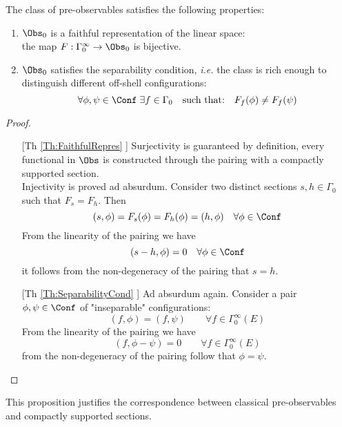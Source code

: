 \documentclass[Main]{subfiles}
\begin{document}
				\begin{proposition}
					The class of pre-observables satisfies the following properties:
					\begin{enumerate}
						\item\label{Th:FaithfulRepres} $\Obs_0$ is a faithful representation of the linear space:\\
									the map $F: \Gamma_0^\infty \rightarrow \Obs_0$ is bijective.
						\item\label{Th:SeparabilityCond} $\Obs_0$ satisfies the separability condition, \textit{i.e.} the class is rich enough to distinguish different off-shell configurations:
						\begin{displaymath}
							\forall \phi,\psi \in \Conf \; \exists f \in \Gamma_0 \quad \textrm{such that:} \quad F_f(\phi) \neq F_f(\psi)
						\end{displaymath}
					\end{enumerate}	
				\end{proposition}
				\begin{proof}
					\begin{itemize}
						\item[[Th \ref{Th:FaithfulRepres}]]
							Surjectivity is guaranteed by definition, every functional in $\Obs$ is constructed through the pairing with a compactly supported section.\\
							Injectivity is proved ad absurdum.
							Consider two distinct sections $s,h \in \Gamma_0$ such that $F_s = F_h$. Then
							\begin{displaymath}
								 ( s, \phi) = F_s(\phi) = F_h(\phi) = (h, \phi)  \quad \forall \phi \in \Conf
							\end{displaymath}
							From the linearity of the pairing we have 
							\begin{displaymath}
								(s-h, \phi) = 0 \quad\forall \phi \in \Conf
							\end{displaymath}
							it follows from the non-degeneracy of the pairing that $s=h$.

						\item[[Th \ref{Th:SeparabilityCond}]]
							Ad absurdum again.
							Consider a pair $\phi,\psi \in \Conf$ of "inseparable" configurations:
							\begin{displaymath}
								(f, \phi) = (f, \psi) \qquad \forall f \in \Gamma_0^\infty(E)
							\end{displaymath}
							From the linearity of the pairing we have 
							\begin{displaymath}
								(f, \phi-\psi) = 0 \qquad \forall f \in \Gamma_0^\infty(E)
							\end{displaymath}
							from the non-degeneracy of the pairing follow that $\phi = \psi$.
					\end{itemize}
				\end{proof}
				This proposition justifies the correspondence between classical pre-observables and compactly supported sections.
			
\end{document}
